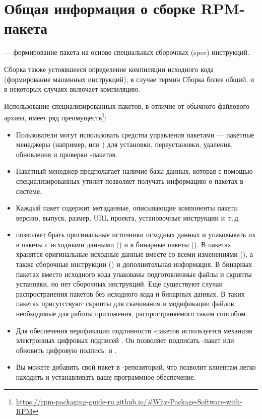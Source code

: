 \hypertarget{3}{\chapter{Общая информация о сборке RPM-пакета}}\label{software-used-for-packaging}

 --- формирование пакета на основе специальных сборочных (spec) инструкций.

Сборка также устоявшееся определение компиляции исходного кода (формирование машинных
инструкций), в случае  термин Сборка более общий, и в некоторых случаях включает
компиляцию.

Использование специализированных пакетов, в отличие от обычного файлового архива, имеет ряд
преимуществ\footnote{\href{https://rpm-packaging-guide-ru.github.io/\#Why-Package-Software-with-RPM}
	{https://rpm-packaging-guide-ru.github.io/\#Why-Package-Software-with-RPM}}:

\begin{itemize}
	\item Пользователи могут использовать средства управления пакетами --- пакетные менеджеры
		(например,  или 	) для установки, переустановки, удаления,
		обновления и проверки -пакетов.
	\item Пакетный менеджер  предполагает наличие базы данных, которая с помощью специализированных
		утилит позволяет получать информацию о пакетах в системе.
	\item Каждый пакет  содержит метаданные, описывающие компоненты пакета: версию, выпуск,
		размер, URL проекта, установочные инструкции и~т.\,д.
	\item {} позволяет брать оригинальные источники исходных данных и упаковывать их в
		пакеты с исходными данными () и в бинарные пакеты (). В пакетах 
		хранятся оригинальные исходные данные вместе со всеми изменениями (), а также сборочные
		инструкции () и дополнительная информация. В бинарных пакетах вместо исходного кода
		упакованы подготовленные файлы и скрипты установки, но нет сборочных инструкций. Ещё существуют
		случаи распространения пакетов без исходного кода и бинарных данных. В таких пакетах присутствуют
		скрипты для скачивания и модификации файлов, необходимые для работы приложения, распространяемого таким способом.
	\item Для обеспечения верификации подлинности -пакетов используется механизм электронных цифровых
		подписей . Он позволяет подписать -пакет или обновить цифровую подпись:
	 и .
	\item Вы можете добавить свой пакет в -репозиторий, что позволит клиентам легко находить и
		устанавливать ваше программное обеспечение.
\end{itemize}

